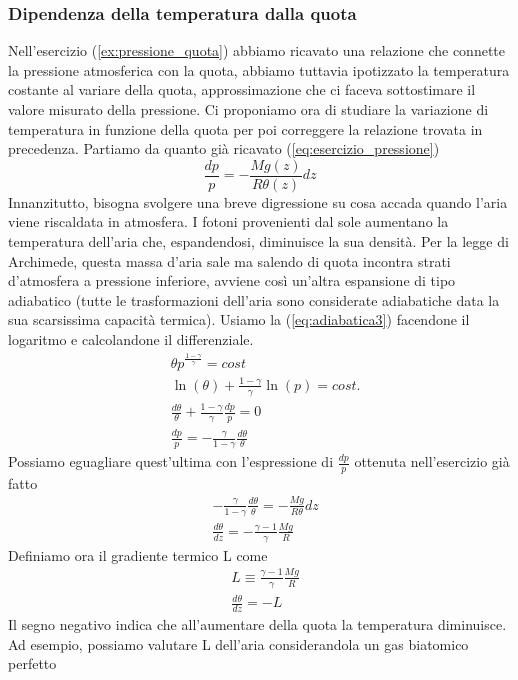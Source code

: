 \documentclass[
10pt, %
a4paper, %
oneside, %
headinclude,footinclude, %
BCOR5mm, %
]{scrartcl}
\begin{document}
\subsubsection{Dipendenza della temperatura dalla quota}
Nell'esercizio (\ref{ex:pressione_quota}) abbiamo ricavato una relazione che connette la pressione atmosferica con la quota, abbiamo tuttavia ipotizzato la temperatura costante al variare della quota, approssimazione che ci faceva sottostimare il valore misurato della pressione. Ci proponiamo ora di studiare la variazione di temperatura in funzione della quota per poi correggere la relazione trovata in precedenza. Partiamo da quanto già ricavato (\ref{eq:esercizio_pressione})
\[\frac{dp}{p} = -\frac{M g(z)}{R\theta(z)} dz\]
Innanzitutto, bisogna svolgere una breve digressione su cosa accada quando l'aria viene riscaldata in atmosfera. I fotoni provenienti dal sole aumentano la temperatura dell'aria che, espandendosi, diminuisce la sua densità. Per la legge di Archimede, questa massa d'aria sale ma salendo di quota incontra strati d'atmosfera a pressione inferiore, avviene così un'altra espansione di tipo adiabatico (tutte le trasformazioni dell'aria sono considerate adiabatiche data la sua scarsissima capacità termica). Usiamo la (\ref{eq:adiabatica3}) facendone il logaritmo e calcolandone il differenziale. 
\begin{align*}
	&\theta p^{\frac{1-\gamma}{\gamma}} = cost\\
	&\ln(\theta) + \frac{1-\gamma}{\gamma}\ln(p) = cost.\\
	&\frac{d\theta}{\theta}+\frac{1-\gamma}{\gamma}\frac{dp}{p} = 0\\
	&\frac{dp}{p} = -\frac{\gamma}{1-\gamma}\frac{d\theta}{\theta}
\end{align*}
Possiamo eguagliare quest'ultima con l'espressione di $\frac{dp}{p}$ ottenuta nell'esercizio già fatto
\begin{align*}
	&-\frac{\gamma}{1-\gamma}\frac{d\theta}{\theta} = -\frac{M g}{R \theta}dz\\
	&\frac{d\theta}{dz} = -\frac{\gamma - 1}{\gamma} \frac{M g}{R}
\end{align*}
Definiamo ora il gradiente termico L come
\begin{align*}
	&L \equiv \frac{\gamma - 1}{\gamma} \frac{M g}{R}\\
	&\frac{d\theta}{dz} = -L 
\end{align*}
Il segno negativo indica che all'aumentare della quota la temperatura diminuisce.\\
Ad esempio, possiamo valutare L dell'aria considerandola un gas biatomico perfetto
\end{document}

